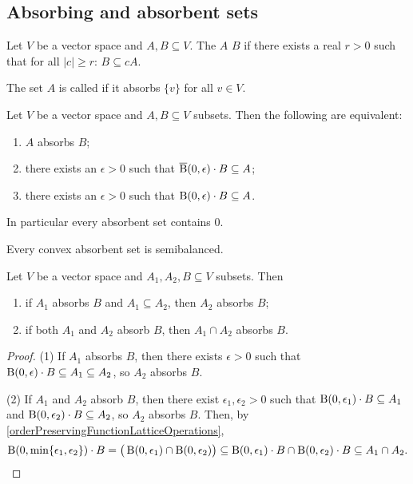 \subsection{Absorbing and absorbent sets}
\begin{definition}
Let $V$ be a vector space and $A,B\subseteq V$. The $A$  $B$ if there exists a real $r>0$ such that for all $|c| \geq r$: $B\subseteq cA$.

The set $A$ is called  if it absorbs $\{v\}$ for all $v\in V$.
\end{definition}

\begin{lemma} \label{absorbingSetLemma}
Let $V$ be a vector space and $A, B\subseteq V$ subsets. Then the following are equivalent:
\begin{enumerate}
\item $A$ absorbs $B$;
\item there exists an $\epsilon>0$ such that $\operatorname{\overline{B}}(0,\epsilon)\cdot B\subseteq A$;
\item there exists an $\epsilon>0$ such that $\operatorname{B}(0,\epsilon)\cdot B\subseteq A$.
\end{enumerate}
In particular every absorbent set contains $0$.
\end{lemma}
\begin{corollary} \label{convexAbsorbentImpliesSemibalanced}
Every convex absorbent set is semibalanced.
\end{corollary}


\begin{proposition} \label{absorbingSetProperties}
Let $V$ be a vector space and $A_1, A_2, B\subseteq V$ subsets. Then
\begin{enumerate}
\item if $A_1$ absorbs $B$ and $A_1\subseteq A_2$, then $A_2$ absorbs $B$;
\item if both $A_1$ and $A_2$ absorb $B$, then $A_1\cap A_2$ absorbs $B$.
\end{enumerate}
\end{proposition}
\begin{proof}
(1) If $A_1$ absorbs $B$, then there exists $\epsilon >0$ such that $\operatorname{B}(0,\epsilon)\cdot B\subseteq A_1 \subseteq A_2$, so $A_2$ absorbs $B$.

(2) If $A_1$ and $A_2$ absorb $B$, then there exist $\epsilon_1, \epsilon_2 >0$ such that $\operatorname{B}(0,\epsilon_1)\cdot B\subseteq A_1$ and $\operatorname{B}(0,\epsilon_2)\cdot B\subseteq A_2$, so $A_2$ absorbs $B$. Then, by \ref{orderPreservingFunctionLatticeOperations},
\[ \operatorname{B}(0,\min\{\epsilon_1, \epsilon_2\})\cdot B = \big(\operatorname{B}(0,\epsilon_1) \cap \operatorname{B}(0,\epsilon_2)\big) \subseteq \operatorname{B}(0,\epsilon_1)\cdot B \cap \operatorname{B}(0,\epsilon_2)\cdot B \subseteq A_1 \cap A_2. \]
\end{proof}

